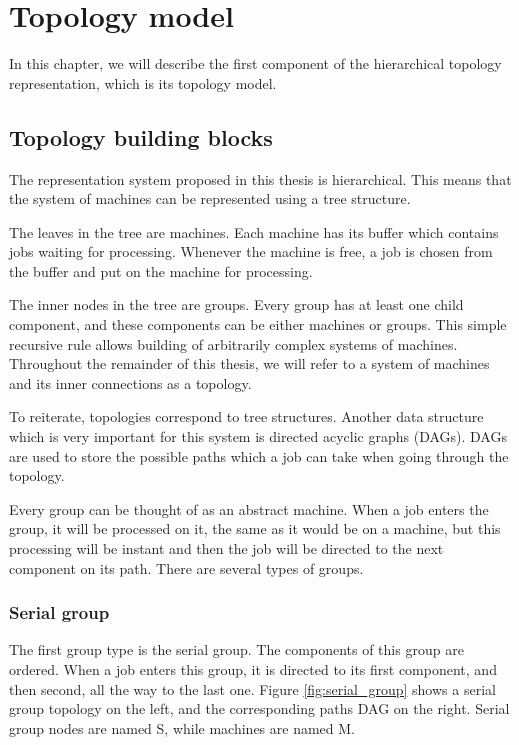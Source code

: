 \chapter{Topology model}
\label{sec:topology_model}

In this chapter, we will describe the first component of the hierarchical topology representation, which is its topology model.

\section{Topology building blocks}
\label{sec:topology_building_blocks}
The representation system proposed in this thesis is hierarchical. This means that the system of machines can be represented using a tree structure.

The leaves in the tree are machines. Each machine has its buffer which contains jobs waiting for processing. Whenever the machine is free, a job is chosen from the buffer and put on the machine for processing.

The inner nodes in the tree are groups. Every group has at least one child component, and these components can be either machines or groups. This simple recursive rule allows building of arbitrarily complex systems of machines. Throughout the remainder of this thesis, we will refer to a system of machines and its inner connections as a topology. 

To reiterate, topologies correspond to tree structures. Another data structure which is very important for this system is directed acyclic graphs (DAGs). DAGs are used to store the possible paths which a job can take when going through the topology.

Every group can be thought of as an abstract machine. When a job enters the group, it will be processed on it, the same as it would be on a machine, but this processing will be instant and then the job will be directed to the next component on its path. There are several types of groups. 

\subsection{Serial group}

The first group type is the serial group. The components of this group are ordered. When a job enters this group, it is directed to its first component, and then second, all the way to the last one. Figure \ref{fig:serial_group} shows a serial group topology on the left, and the corresponding paths DAG on the right. Serial group nodes are named S, while machines are named M.

